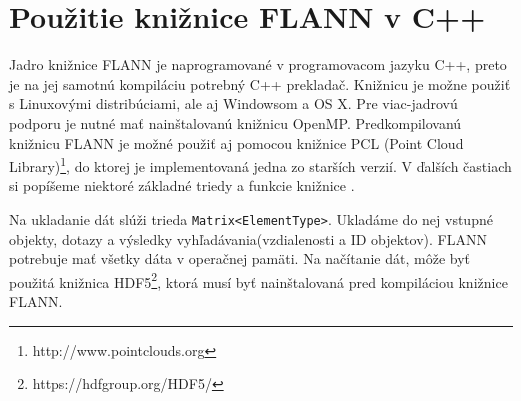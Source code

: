 \documentclass[12pt,a4paper,oneside]{fithesis2}
\begin{document}
	\section{Použitie knižnice FLANN v C++}
	Jadro knižnice FLANN je naprogramované v programovacom jazyku C++, preto je na jej samotnú kompiláciu potrebný C++ prekladač. Knižnicu je možne použiť s Linuxovými distribúciami, ale aj Windowsom a OS X. Pre viac-jadrovú podporu je nutné mať nainštalovanú knižnicu OpenMP. Predkompilovanú knižnicu FLANN je  možné použiť aj pomocou knižnice PCL (Point Cloud Library)\footnote{http://www.pointclouds.org}, do ktorej je implementovaná jedna zo starších verzií. V ďalších častiach si popíšeme niektoré základné triedy a funkcie knižnice \cite{manual}.
	
	Na ukladanie dát slúži trieda \texttt{Matrix<ElementType>}. Ukladáme do nej vstupné objekty, dotazy a výsledky vyhľadávania(vzdialenosti a ID objektov). FLANN potrebuje mať všetky dáta v operačnej pamäti. Na načítanie dát, môže byť použitá knižnica HDF5\footnote{https://hdfgroup.org/HDF5/}, ktorá musí byť nainštalovaná pred kompiláciou knižnice FLANN. 
	
\end{document}
